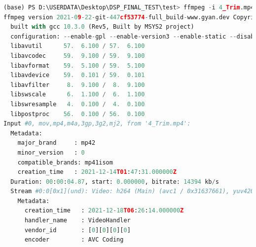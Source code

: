 \documentclass[10pt,UTF8]{ctexart}
\begin{document}
\begin{lstlisting}[language={python}]
(base) PS D:\USERDATA\Desktop\DSP_FINAL_TEST\test> ffmpeg -i 4_Trim.mp4 -s 320x240 -pix_fmt yuv420p -r 15 4_Trim.yuv
ffmpeg version 2021-09-22-git-447cf53774-full_build-www.gyan.dev Copyright (c) 2000-2021 the FFmpeg developers
  built with gcc 10.3.0 (Rev5, Built by MSYS2 project)
  configuration: --enable-gpl --enable-version3 --enable-static --disable-w32threads --disable-autodetect --enable-fontconfig --enable-iconv --enable-gnutls --enable-libxml2 --enable-gmp --enable-lzma --enable-libsnappy --enable-zlib --enable-librist --enable-libsrt --enable-libssh --enable-libzmq --enable-avisynth --enable-libbluray --enable-libcaca --enable-sdl2 --enable-libdav1d --enable-libzvbi --enable-librav1e --enable-libsvtav1 --enable-libwebp --enable-libx264 --enable-libx265 --enable-libxvid --enable-libaom --enable-libopenjpeg --enable-libvpx --enable-libass --enable-frei0r --enable-libfreetype --enable-libfribidi --enable-libvidstab --enable-libvmaf --enable-libzimg --enable-amf --enable-cuda-llvm --enable-cuvid --enable-ffnvcodec --enable-nvdec --enable-nvenc --enable-d3d11va --enable-dxva2 --enable-libmfx --enable-libglslang --enable-vulkan --enable-opencl --enable-libcdio --enable-libgme --enable-libmodplug --enable-libopenmpt --enable-libopencore-amrwb --enable-libmp3lame --enable-libshine --enable-libtheora --enable-libtwolame --enable-libvo-amrwbenc --enable-libilbc --enable-libgsm --enable-libopencore-amrnb --enable-libopus --enable-libspeex --enable-libvorbis --enable-ladspa --enable-libbs2b --enable-libflite --enable-libmysofa --enable-librubberband --enable-libsoxr --enable-chromaprint
  libavutil      57.  6.100 / 57.  6.100
  libavcodec     59.  9.100 / 59.  9.100
  libavformat    59.  5.100 / 59.  5.100
  libavdevice    59.  0.101 / 59.  0.101
  libavfilter     8.  9.100 /  8.  9.100
  libswscale      6.  1.100 /  6.  1.100
  libswresample   4.  0.100 /  4.  0.100
  libpostproc    56.  0.100 / 56.  0.100
Input #0, mov,mp4,m4a,3gp,3g2,mj2, from '4_Trim.mp4':
  Metadata:
    major_brand     : mp42
    minor_version   : 0
    compatible_brands: mp41isom
    creation_time   : 2021-12-14T01:47:31.000000Z
  Duration: 00:00:04.87, start: 0.000000, bitrate: 14394 kb/s
  Stream #0:0[0x1](und): Video: h264 (Main) (avc1 / 0x31637661), yuv420p, 720x1280 [SAR 1:1 DAR 9:16], 14600 kb/s, 30 fps, 30 tbr, 30k tbn (default)
    Metadata:
      creation_time   : 2021-12-18T06:26:14.000000Z
      handler_name    : VideoHandler
      vendor_id       : [0][0][0][0]
      encoder         : AVC Coding

\end{lstlisting}
\end{document}
